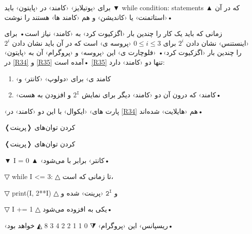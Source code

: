 \documentclass[openany, twocolumn]{book}
\begin{document}
\begin{Usage}
برای ‹یوتیلایز› ‹کامند›  در ‹پایتون› باید 
▼
while condition:
	statements
▲
 که در آن  ‹استاتمنت› یا ‹کاندیشن› و  هم ‹کامند ها› هستند را نوشت•
\end{Usage}

زمانی که باید یک کار را چندین بار ‹اگزکیوت کرد› به ‹کامند›  نیاز است• برای ‹اینستنس› نشان دادن $2^{i}$ برای $0\leq i\leq3$ ‹پروسه ی› است که در آن باید نشان دادن $2^{i}$ را چندین بار ‹اگزکیوت کرد›• ‹فلوچارت ی› این ‹پروسه› و ‹پروگرام› آن به ‹پایتون› در \ref{R34} و \ref{R35} آمده است• \ref{R35} تنها دو ‹کامند› دارد:
\begin{enumerate}
\item ‹کامند ی› برای ‹دولوپ› ‹کانتر›  و
\item ‹کامند›  که درون آن دو ‹کامند› دیگر برای نمایش $2^{\mathtt{I}}$ و افزودن به  هست•
\end{enumerate}
‹پارت های› ‹ایکوال› با این دو ‹کامند› در \ref{R34} هم ‹هایلایت› شده‌اند•

\begin{Flowchart}
\caption{❬پرینت❭ کردن توان‌های \label{R34}}
\end{Flowchart}

\begin{Program}
\caption{❬پرینت❭ کردن توان‌های \label{R35}}

\begin{structure}
▼
I = 0
▲
 ‹کانتر›  برابر با  می‌شود•%
\end{structure}
\begin{structure}
▽
while I <= 3:
△
 تا زمانی که  است، %
\begin{structure}
▽
print(I, 2**I)
△
  و $\mathtt{2}^{\mathtt{I}}$ ‹پرینت› شده و%
\end{structure}
\begin{structure}
▽
I += 1
△
 یکی به  افزوده می‌شود•%
\end{structure}
\end{structure}

‹ریسپانس› این ‹پروگرام› 
⧨
0 1
1 2
2 4
3 8
◭
 خواهد بود•
\end{Program}
\end{document}
